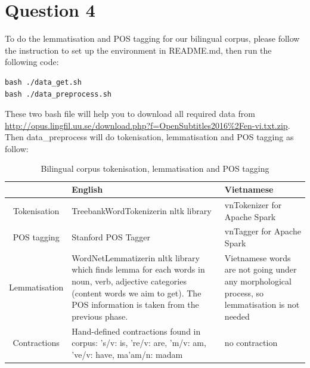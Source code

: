 \documentclass[12pt]{article}
\begin{document}
\section{Question 4}

To do the lemmatisation and POS tagging for our bilingual corpus, please follow the instruction to set up the environment in README.md, then run the following code:
\begin{verbatim}
bash ./data_get.sh
bash ./data_preprocess.sh
\end{verbatim}

These two bash file will help you to download all required data from \url{http://opus.lingfil.uu.se/download.php?f=OpenSubtitles2016\%2Fen-vi.txt.zip}. Then data\_preprocess will do tokenisation, lemmatisation and POS tagging as follow:
\begin{table}[H]
	\begin{tabular}{ | c | p{5cm} | p{5cm} | }
		\hline
		& English & Vietnamese \\
		\hline
		Tokenisation &
		TreebankWordTokenizer\footnotemark[1] in nltk library
		& 
		vnTokenizer\cite{le2008hybrid} for Apache Spark\texttrademark
		\\
		\hline
		POS tagging &
		Stanford POS Tagger\cite{toutanova2003feature}& 
		vnTagger\cite{le2010empirical} for Apache Spark\texttrademark
		\\
		\hline
		Lemmatisation & 
		WordNetLemmatizer\footnotemark[2] in nltk library which finds lemma for each words in noun, verb, adjective categories (content words we aim to get). The POS information is taken from the previous phase.
		& 
		Vietnamese words are not going under any morphological process, so lemmatisation is not needed
		\\
		\hline
		Contractions & Hand-defined contractions found in corpus: 's/v: is, 're/v: are, 'm/v: am, 've/v: have, ma'am/n: madam & no contraction
		\\
		\hline
	\end{tabular}
	\caption{Bilingual corpus tokenisation, lemmatisation and POS tagging}
	\label{table:dat_preprocess}
\end{table}
\end{document}
